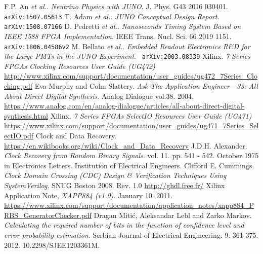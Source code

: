 \documentclass[11pt]{article}
\renewcommand{\>}{\rangle} \renewcommand{\emptyset}{\varnothing}
\begin{document}
\begin{thebibliography}{0}
F.P. An \textit{et al.}. \textit{Neutrino Physics
    with JUNO}. J. Phys. G43 2016 030401. {\tt arXiv:1507.05613}
T. Adam \textit{et al.}. \textit{JUNO Conceptual Design
    Report}. {\tt arXiv:1508.07166}
D. Pedretti \textit{et al.}. \textit{Nanoseconds
    Timing System Based on IEEE 1588 FPGA Implementation}. IEEE Trans. Nucl.
  Sci. 66 2019 1151. {\tt arXiv:1806.04586v2}
M. Bellato \textit{et al.}. \textit{Embedded
    Readout Electronics R\&D for the Large PMTs in the JUNO Experiment}. { \tt
    arXiv:2003.08339}
Xilinx. \textit{7 Series FPGAs Clocking Resources User Guide
    (UG472)}
  \url{http://www.xilinx.com/support/documentation/user_guides/ug472_7Series_Clocking.pdf}
Eva Murphy and Colm Slattery. \textit{Ask The Application
    Engineer—33: All About Direct Digital Synthesis}. Analog Dialogue vol.38.
  2004.
  \url{https://www.analog.com/en/analog-dialogue/articles/all-about-direct-digital-synthesis.html}
Xilinx. \textit{7 Series FPGAs SelectIO Resources User Guide
    (UG471)}
  \url{https://www.xilinx.com/support/documentation/user_guides/ug471_7Series_SelectIO.pdf}
Clock and Data Recovery.
  \url{https://en.wikibooks.org/wiki/Clock_and_Data_Recovery}
J.D.H. Alexander. \textit{Clock Recovery from Random Binary
    Signals}. vol. 11. pp. 541 - 542. October 1975 in Electronics Letters.
  Institution of Electrical Engineers.
Clifford E. Cummings. \textit{Clock Domain Crossing (CDC)
    Design \& Verification Techniques Using SystemVerilog}. SNUG Boston 2008.
  Rev. 1.0
 \url{http://ghdl.free.fr/}
Xilinx Application Note, \textit{XAPP884 (v1.0)}. January 10.
  2011.
  \url{https://www.xilinx.com/support/documentation/application_notes/xapp884_PRBS_GeneratorChecker.pdf}
Dragan Mitić, Aleksandar Lebl and Zarko Markov.
  \textit{Calculating the required number of bits in the function of confidence
    level and error probability estimation}. Serbian Journal of Electrical
  Engineering. 9. 361-375. 2012. 10.2298/SJEE1203361M.
\end{thebibliography}
\end{document}
